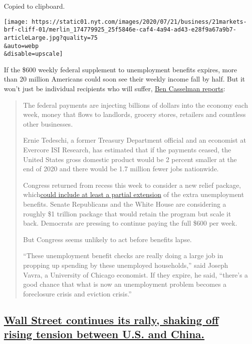 Copied to clipboard.

\texttt{[image: https://static01.nyt.com/images/2020/07/21/business/21markets-brf-cliff-01/merlin\_174779925\_25f5846e-caf4-4a94-ad43-e28f9a67a9b7-articleLarge.jpg?quality=75\\\&auto=webp\\\&disable=upscale]}

If the \$600 weekly federal supplement to unemployment benefits expires,
more than 20 million Americans could soon see their weekly income fall
by half. But it won't just be individual recipients who will suffer,
\href{https://www.nytimes.com/2020/07/21/business/economy/coronavirus-unemployment-benefits.html}{Ben
Casselman reports}:

\begin{quote}
The federal payments are injecting billions of dollars into the economy
each week, money that flows to landlords, grocery stores, retailers and
countless other businesses.

Ernie Tedeschi, a former Treasury Department official and an economist
at Evercore ISI Research, has estimated that if the payments ceased, the
United States gross domestic product would be 2 percent smaller at the
end of 2020 and there would be 1.7 million fewer jobs nationwide.

Congress returned from recess this week to consider a new relief
package,
which\href{https://www.nytimes.com/2020/07/20/us/politics/congress-coronavirus-aid-package.html}{could
include at least a partial extension} of the extra unemployment
benefits. Senate Republicans and the White House are considering a
roughly \$1 trillion package that would retain the program but scale it
back. Democrats are pressing to continue paying the full \$600 per week.

But Congress seems unlikely to act before benefits lapse.

``These unemployment benefit checks are really doing a large job in
propping up spending by these unemployed households,'' said Joseph
Vavra, a University of Chicago economist. If they expire, he said,
``there's a good chance that what is now an unemployment problem becomes
a foreclosure crisis and eviction crisis.''
\end{quote}

\hypertarget{wall-street-continues-its-rally-shaking-off-rising-tension-between-us-and-china}{%
\subsection{\texorpdfstring{\protect\hyperlink{wall-street-continues-its-rally-shaking-off-rising-tension-between-us-and-china}{Wall
Street continues its rally, shaking off rising tension between U.S. and
China.}}{Wall Street continues its rally, shaking off rising tension between U.S. and China.}}\label{wall-street-continues-its-rally-shaking-off-rising-tension-between-us-and-china}}

